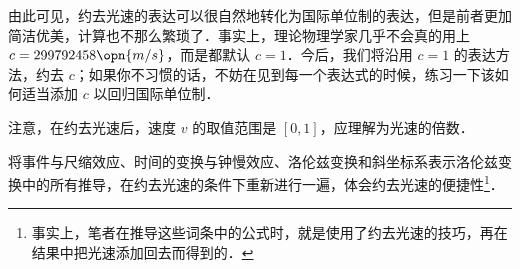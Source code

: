 由此可见，约去光速的表达可以很自然地转化为国际单位制的表达，但是前者更加简洁优美，计算也不那么繁琐了．事实上，理论物理学家几乎不会真的用上 $c=299792458\opn{m/s}$，而是都默认 $c=1$．今后，我们将沿用 $c=1$ 的表达方法，约去 $c$；如果你不习惯的话，不妨在见到每一个表达式的时候，练习一下该如何适当添加 $c$ 以回归国际单位制．

注意，在约去光速后，速度 $v$ 的取值范围是 $[0,1]$，应理解为光速的倍数．

\begin{exercise}{}
将事件与尺缩效应、时间的变换与钟慢效应、洛伦兹变换和斜坐标系表示洛伦兹变换中的所有推导，在约去光速的条件下重新进行一遍，体会约去光速的便捷性\footnote{事实上，笔者在推导这些词条中的公式时，就是使用了约去光速的技巧，再在结果中把光速添加回去而得到的．}．
\end{exercise}


